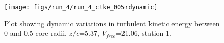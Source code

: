 \begin{figure}[H]
\centering
\texttt{[image: figs/run\_4/run\_4\_ctke\_005rdynamic]}
\caption{Plot showing dynamic variations in turbulent kinetic energy between 0 and 0.5 core radii. $z/c$=5.37, $V_{free}$=21.06, station 1.}
\label{fig:run_4_ctke_005rdynamic}
\end{figure}



